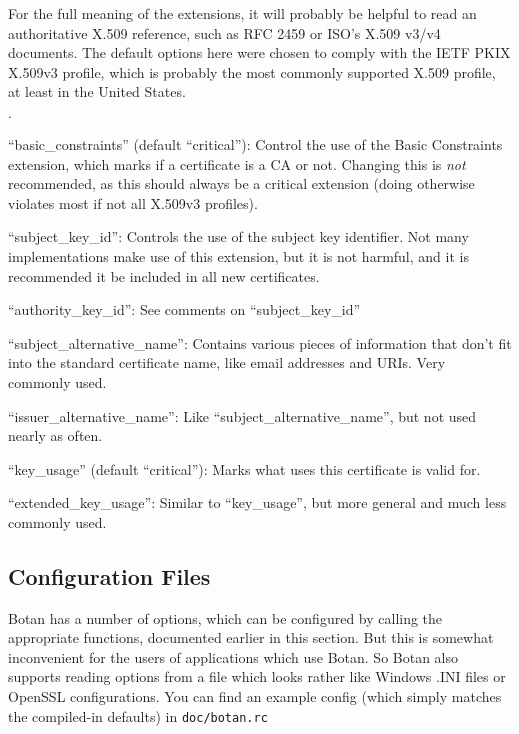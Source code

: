 \documentclass{article}
\newcommand{\filename}[1]{\texttt{#1}}
\begin{document}
For the full meaning of the extensions, it will probably be helpful to read an
authoritative X.509 reference, such as RFC 2459 or ISO's X.509 v3/v4 documents.
The default options here were chosen to comply with the IETF PKIX X.509v3
profile, which is probably the most commonly supported X.509 profile, at least
in the United States.

\begin{list}{$\cdot$}
   \item ``basic\_constraints'' (default ``critical''): Control the use of the
         Basic Constraints extension, which marks if a certificate is a CA or
         not. Changing this is \emph{not} recommended, as this should always
         be a critical extension (doing otherwise violates most if not all
         X.509v3 profiles).
   \item
   \item ``subject\_key\_id'': Controls the use of the subject key identifier.
         Not many implementations make use of this extension, but it is not
         harmful, and it is recommended it be included in all new certificates.

   \item ``authority\_key\_id'': See comments on ``subject\_key\_id''

   \item ``subject\_alternative\_name'': Contains various pieces of information
         that don't fit into the standard certificate name, like email
         addresses and URIs. Very commonly used.

   \item ``issuer\_alternative\_name'': Like ``subject\_alternative\_name'',
         but not used nearly as often.

   \item ``key\_usage'' (default ``critical''): Marks what uses this
         certificate is valid for.

   \item ``extended\_key\_usage'': Similar to ``key\_usage'', but more general
         and much less commonly used.
\end{list}

\pagebreak

\subsection{Configuration Files}

Botan has a number of options, which can be configured by calling the
appropriate functions, documented earlier in this section. But this is somewhat
inconvenient for the users of applications which use Botan. So Botan also
supports reading options from a file which looks rather like Windows .INI files
or OpenSSL configurations. You can find an example config (which simply matches
the compiled-in defaults) in \filename{doc/botan.rc}
\end{document}
